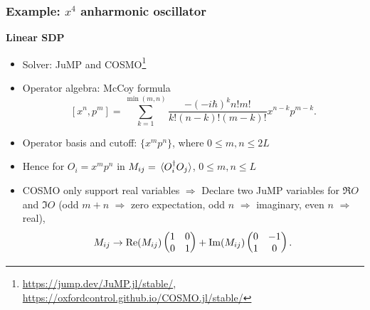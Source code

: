 \documentclass{beamer}
\begin{document}
\begin{frame}
\frametitle{Example: $x^4$ anharmonic oscillator}

\textbf{Linear SDP}

\begin{itemize}
    \item Solver: JuMP and COSMO\footnote{\href{https://jump.dev/JuMP.jl/stable/}{https://jump.dev/JuMP.jl/stable/}, \href{https://oxfordcontrol.github.io/COSMO.jl/stable/}{https://oxfordcontrol.github.io/COSMO.jl/stable/}}
    \item Operator algebra: McCoy formula
    \begin{equation}
        {\left[{ {x}}^{n},{ {p}}^{m}\right]=\sum _{k=1}^{\min \left(m,n\right)}{{\frac {-\left(-i\hbar \right)^{k}n!m!}{k!\left(n-k\right)!\left(m-k\right)!}}{ {x}}^{n-k}{ {p}}^{m-k}}}.
    \end{equation}
    \item Operator basis and cutoff: $\{x^m p^n\}$, where $0 \leq m, n \leq 2L$ 
    \item Hence for $O_i = x^m p^n$ in $M_{ij} = \expval*{O_i^\dagger O_j}$, $0 \leq m, n \leq L$
    \item COSMO only support real variables $\Rightarrow$ Declare two JuMP variables for $\Re O$ and $\Im O$ (odd $m + n$ $\Rightarrow$ zero expectation, odd $n$ $\Rightarrow$ imaginary, even $n$ $\Rightarrow$ real),
    \begin{equation}
        M_{ij} \to \Re(M_{ij}) \pmqty{1 & 0 \\ 0 & 1} + \Im(M_{ij}) \pmqty{0 & -1 \\ 1 & 0}.
    \end{equation}
\end{itemize}

\end{frame}
\end{document}
